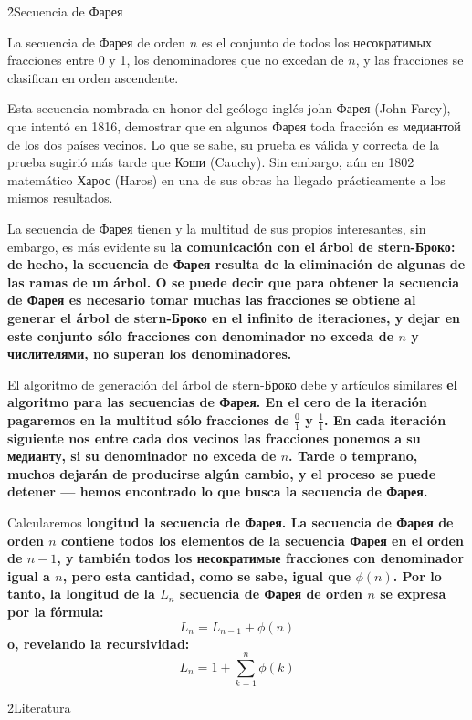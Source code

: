 \h2{Secuencia de Фарея}

La secuencia de Фарея de orden $n$ es el conjunto de todos los несократимых fracciones entre 0 y 1, los denominadores que no excedan de $n$, y las fracciones se clasifican en orden ascendente.

Esta secuencia nombrada en honor del geólogo inglés john Фарея (John Farey), que intentó en 1816, demostrar que en algunos Фарея toda fracción es медиантой de los dos países vecinos. Lo que se sabe, su prueba es válida y correcta de la prueba sugirió más tarde que Коши (Cauchy). Sin embargo, aún en 1802 matemático Харос (Haros) en una de sus obras ha llegado prácticamente a los mismos resultados.

La secuencia de Фарея tienen y la multitud de sus propios interesantes, sin embargo, es más evidente su \bf{la comunicación con el árbol de stern-Броко}: de hecho, la secuencia de Фарея resulta de la eliminación de algunas de las ramas de un árbol. O se puede decir que para obtener la secuencia de Фарея es necesario tomar muchas las fracciones se obtiene al generar el árbol de stern-Броко en el infinito de iteraciones, y dejar en este conjunto sólo fracciones con denominador no exceda de $n$ y числителями, no superan los denominadores.

El algoritmo de generación del árbol de stern-Броко debe y artículos similares \bf{el algoritmo} para las secuencias de Фарея. En el cero de la iteración pagaremos en la multitud sólo fracciones de $\frac{0}{1}$ y $\frac{1}{1}$. En cada iteración siguiente nos entre cada dos vecinos las fracciones ponemos a su медианту, si su denominador no exceda de $n$. Tarde o temprano, muchos dejarán de producirse algún cambio, y el proceso se puede detener --- hemos encontrado lo que busca la secuencia de Фарея.

Calcularemos \bf{longitud} la secuencia de Фарея. La secuencia de Фарея de orden $n$ contiene todos los elementos de la secuencia Фарея en el orden de $n-1$, y también todos los несократимые fracciones con denominador igual a $n$, pero esta cantidad, como se sabe, igual que $\phi(n)$. Por lo tanto, la longitud de la $L_n$ secuencia de Фарея de orden $n$ se expresa por la fórmula:
$$ L_n = L_{n-1} + \phi(n) $$
o, revelando la recursividad:
$$ L_n = 1 + \sum_{k=1}^n \phi(k) $$

\h2{Literatura}

\ul{
\li {}
}